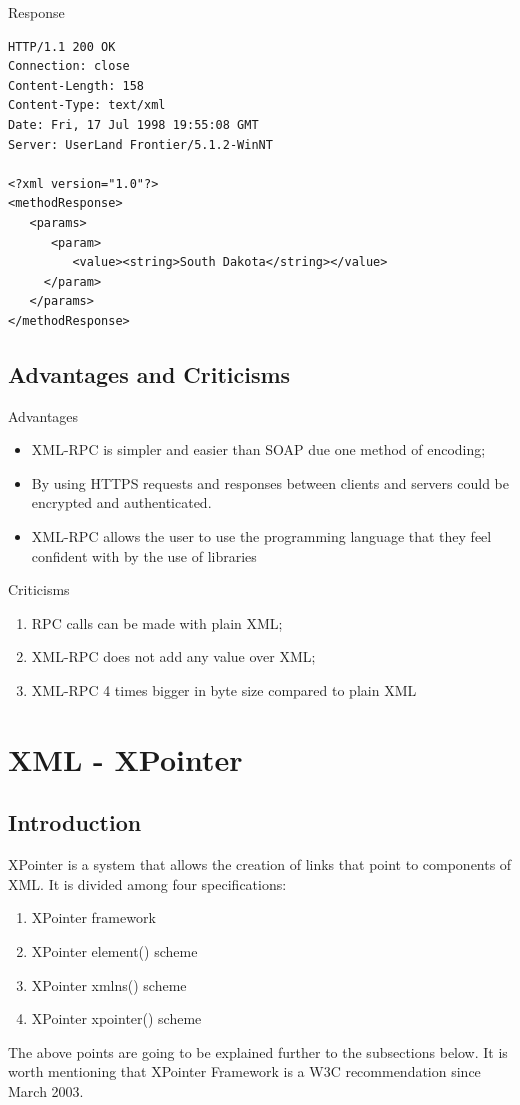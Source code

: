 \documentclass[11pt]{article}
\begin{document}
\newpage
 Response
\begin{lstlisting}[frame=single]
HTTP/1.1 200 OK
Connection: close
Content-Length: 158
Content-Type: text/xml
Date: Fri, 17 Jul 1998 19:55:08 GMT
Server: UserLand Frontier/5.1.2-WinNT
        
<?xml version="1.0"?>
<methodResponse>
   <params>
      <param>
         <value><string>South Dakota</string></value>
     </param>
   </params>
</methodResponse>
\end{lstlisting}

\subsection{Advantages and Criticisms}

Advantages 
\begin{itemize}
\item XML-RPC is simpler and easier than SOAP due one method of encoding;
\item By using HTTPS requests and responses between clients and servers could be encrypted and authenticated.
\item XML-RPC  allows the user to use the programming language that they feel confident  with by the use of libraries
\end{itemize}

Criticisms
\begin{enumerate}
\item RPC calls can be made with plain XML; 

\item XML-RPC does not add any value over XML; 

\item XML-RPC 4 times bigger in byte size compared to plain XML
\end{enumerate}




\newpage
\section{XML - XPointer}
\author{Stamatis Maritsas}
\subsection{Introduction}
XPointer is a system that allows the creation of links that point to components of XML. It is divided among four specifications:
\begin{enumerate}
\item XPointer framework
\item XPointer element() scheme
\item XPointer xmlns() scheme
\item XPointer xpointer() scheme
\end{enumerate}
The above points are going to be explained further to the subsections below. It is worth mentioning that XPointer Framework is a W3C recommendation since March 2003.
\end{document}
